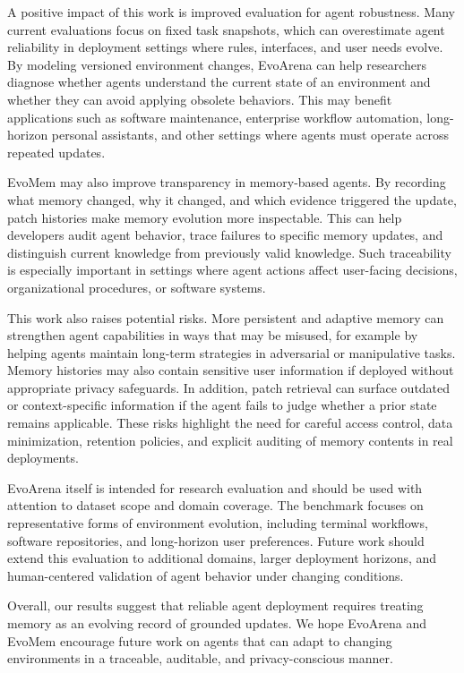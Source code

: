 \documentclass{llmxive}
\begin{document}
A positive impact of this work is improved evaluation for agent robustness. Many current evaluations focus on fixed task snapshots, which can overestimate agent reliability in deployment settings where rules, interfaces, and user needs evolve. By modeling versioned environment changes, EvoArena can help researchers diagnose whether agents understand the current state of an environment and whether they can avoid applying obsolete behaviors. This may benefit applications such as software maintenance, enterprise workflow automation, long-horizon personal assistants, and other settings where agents must operate across repeated updates.

EvoMem may also improve transparency in memory-based agents. By recording what memory changed, why it changed, and which evidence triggered the update, patch histories make memory evolution more inspectable. This can help developers audit agent behavior, trace failures to specific memory updates, and distinguish current knowledge from previously valid knowledge. Such traceability is especially important in settings where agent actions affect user-facing decisions, organizational procedures, or software systems.

This work also raises potential risks. More persistent and adaptive memory can strengthen agent capabilities in ways that may be misused, for example by helping agents maintain long-term strategies in adversarial or manipulative tasks. Memory histories may also contain sensitive user information if deployed without appropriate privacy safeguards. In addition, patch retrieval can surface outdated or context-specific information if the agent fails to judge whether a prior state remains applicable. These risks highlight the need for careful access control, data minimization, retention policies, and explicit auditing of memory contents in real deployments.

EvoArena itself is intended for research evaluation and should be used with attention to dataset scope and domain coverage. The benchmark focuses on representative forms of environment evolution, including terminal workflows, software repositories, and long-horizon user preferences. Future work should extend this evaluation to additional domains, larger deployment horizons, and human-centered validation of agent behavior under changing conditions.

Overall, our results suggest that reliable agent deployment requires treating memory as an evolving record of grounded updates. We hope EvoArena and EvoMem encourage future work on agents that can adapt to changing environments in a traceable, auditable, and privacy-conscious manner.
\end{document}
